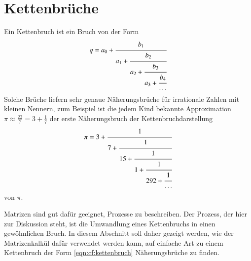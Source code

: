 %
%
%
\section{Kettenbrüche}
Ein Kettenbruch ist ein Bruch von der Form
\begin{equation}
q
=
a_0 + \cfrac{b_1}{a_1+\cfrac{b_2}{a_2+\cfrac{b_3}{a_3+\cfrac{b_4}{\dots}}}}
\label{eqn:cf:kettenbruch}
\end{equation}
Solche Brüche liefern sehr genaue Näherungsbrüche für irrationale
Zahlen mit kleinen Nennern, zum Beispiel ist die jedem Kind bekannte
Approximation $\pi\approx  \frac{22}7=3+\frac{1}{7}$ der erste
Näherungsbruch der Kettenbruchdarstellung
\[
\pi
=
3+\cfrac{1}{
7+\cfrac{1}{
15+\cfrac{1}{
1+\cfrac{1}{
292+\cfrac{1}{\dots}}}}}
\]
von $\pi$.

Matrizen sind gut dafür geeignet, Prozesse zu beschreiben.
Der Prozess, der hier zur Diskussion steht, ist die Umwandlung eines
Kettenbruchs in einen gewöhnlichen Bruch.
In diesem Abschnitt soll daher gezeigt werden, wie der Matrizenkalkül
dafür verwendet werden kann, auf einfache Art zu einem Kettenbruch
der Form \eqref{eqn:cf:kettenbruch} Näherungsbrüche zu finden.








